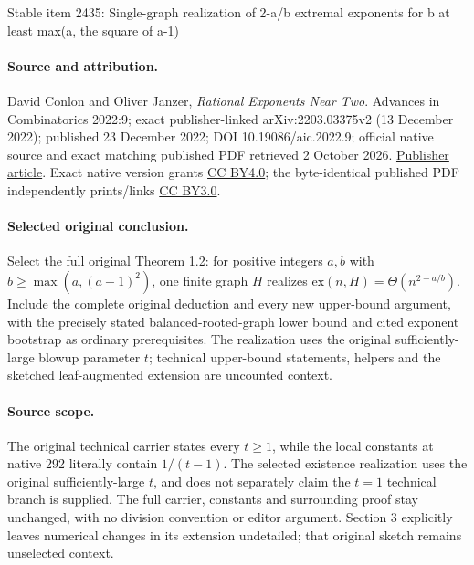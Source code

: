 \documentclass[11pt]{article}
\numberwithin{equation}{section}
\theoremstyle{definition}
\begin{document}
\begin{center}{\Large Stable item 2435: Single-graph realization of 2-a/b extremal exponents for b at least max(a, the square of a-1)}\end{center}
\paragraph{Source and attribution.} David Conlon and Oliver Janzer, \emph{Rational Exponents Near Two}. Advances in Combinatorics 2022:9; exact publisher-linked arXiv:2203.03375v2 (13 December 2022); published 23 December 2022; DOI 10.19086/aic.2022.9; official native source and exact matching published PDF retrieved 2 October 2026. \href{https://www.advancesincombinatorics.com/article/57310-rational-exponents-near-two}{Publisher article}. Exact native version grants \href{https://creativecommons.org/licenses/by/4.0/}{CC BY4.0}; the byte-identical published PDF independently prints/links \href{https://creativecommons.org/licenses/by/3.0/}{CC BY3.0}.
\paragraph{Selected original conclusion.} Select the full original Theorem 1.2: for positive integers \(a,b\) with \(b\ge\max(a,(a-1)^2)\), one finite graph \(H\) realizes \(\mathrm{ex}(n,H)=\Theta(n^{2-a/b})\). Include the complete original deduction and every new upper-bound argument, with the precisely stated balanced-rooted-graph lower bound and cited exponent bootstrap as ordinary prerequisites. The realization uses the original sufficiently-large blowup parameter \(t\); technical upper-bound statements, helpers and the sketched leaf-augmented extension are uncounted context.
\paragraph{Source scope.} The original technical carrier states every \(t\ge1\), while the local constants at native 292 literally contain \(1/(t-1)\). The selected existence realization uses the original sufficiently-large \(t\), and does not separately claim the \(t=1\) technical branch is supplied. The full carrier, constants and surrounding proof stay unchanged, with no division convention or editor argument. Section 3 explicitly leaves numerical changes in its extension undetailed; that original sketch remains unselected context.
\end{document}
